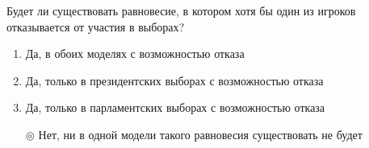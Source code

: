 \solution %

\task Будет ли существовать равновесие, в котором хотя бы один из игроков отказывается от участия в выборах?
\begin{enumerate}[label=$\circ$] %
	\item Да, в обоих моделях с возможностью отказа	%
	\item Да, только в президентских выборах с возможностью отказа	%
	\item Да, только в парламентских выборах с возможностью отказа	%
	\item[$\circledcirc$] Нет, ни в одной модели такого равновесия существовать не будет
\end{enumerate}

\solution %